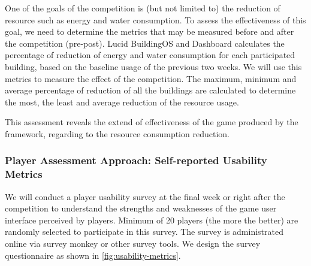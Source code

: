 \documentclass[11pt,oneside]{book}
\begin{document}
One of the goals of the competition is (but not limited to) the reduction of resource such as energy and water consumption. To assess the effectiveness of this goal, we need to determine the metrics that may be measured before and after the competition (pre-post). Lucid BuildingOS and Dashboard calculates the percentage of reduction of energy and water consumption for each participated building, based on the baseline usage of the previous two weeks. We will use this metrics to measure the effect of the competition. The maximum, minimum and average percentage of reduction of all the buildings are calculated to determine the most, the least and average reduction of the resource usage. 

This assessment reveals the extend of effectiveness of the game produced by the framework, regarding to the resource consumption reduction. 
  
\subsubsection{Player Assessment Approach: Self-reported Usability Metrics} 
\label{Self-reported usability metrics}

We will conduct a player usability survey at the final week or right after the competition to understand the strengths and weaknesses of the game user interface perceived by players. Minimum of 20 players (the more the better) are randomly selected to participate in this survey. The survey is administrated online via survey monkey or other survey tools. We design the survey questionnaire as shown in \autoref{fig:usability-metrics}.
       
\end{document}
